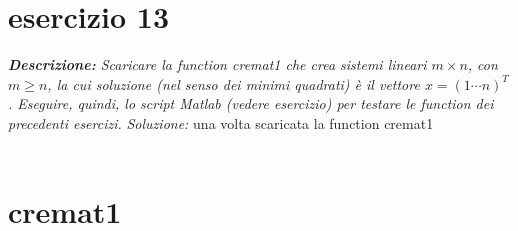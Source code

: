 \section{esercizio 13}
\textit{\textbf{Descrizione:} Scaricare la function cremat1 che crea sistemi lineari $m \times n$, con $m \geq n$, la cui soluzione (nel senso dei minimi quadrati) è il vettore $x = (1 \cdots n)^{T}$. Eseguire, quindi, lo script Matlab (vedere esercizio) per testare le function dei precedenti esercizi.}\newline
\noindent\emph{Soluzione: }\newline
una volta scaricata la function cremat1
\\~\\

\section*{cremat1}

\newpage

